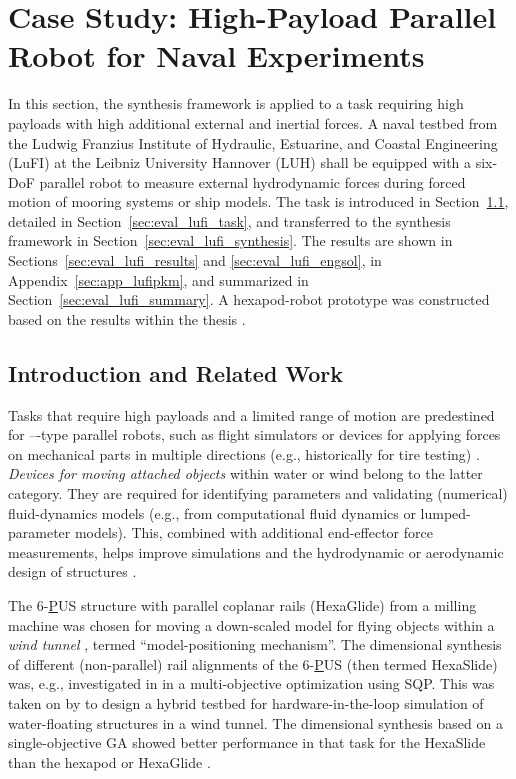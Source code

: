 %
%
%

\section{Case Study: High-Payload Parallel Robot for Naval Experiments}
\label{sec:eval_water}


%

%

%

%
%
%
%
%
%
%
%
%
%
%
%

In this section, the synthesis framework is applied to a task requiring high payloads with high additional external and inertial forces. %
%
%
A naval testbed from the Ludwig Franzius Institute of Hydraulic, Estuarine, and Coastal Engineering (LuFI) at the Leibniz University Hannover (LUH) shall be equipped with a six-DoF parallel robot to measure external hydrodynamic forces during forced motion of mooring systems or ship models.
The task is introduced in Section~\ref{sec:eval_lufi_intro}, detailed in Section~\ref{sec:eval_lufi_task}, and transferred to the synthesis framework in Section~\ref{sec:eval_lufi_synthesis}.
The results are shown in Sections~\ref{sec:eval_lufi_results} and \ref{sec:eval_lufi_engsol}, in Appendix~\ref{sec:app_lufipkm}, and summarized in Section~\ref{sec:eval_lufi_summary}.
A hexapod-robot prototype was constructed based on the results within the thesis \cite{Fettin2023_M1174}. %

\subsection{Introduction and Related Work}
\label{sec:eval_lufi_intro}

Tasks that require high payloads and a limited range of motion are predestined for ---type parallel robots, such as flight simulators or devices for applying forces on mechanical parts in multiple directions (e.g., historically for tire testing) \cite{Merlet2006}. 
\emph{Devices for moving attached objects} within water or wind belong to the latter category.
They are required for identifying parameters and validating (numerical) fluid-dynamics models (e.g., from computational fluid dynamics or lumped-parameter models). 
This, combined with additional end-effector force measurements, helps improve simulations and the hydrodynamic or aerodynamic design of structures \cite{GibertiFer2015}.
%

The 6-\underline{P}US %
%
structure with parallel coplanar rails (HexaGlide) from a milling machine was chosen for moving a down-scaled model for flying objects within a \emph{wind tunnel} \cite{Bergmann2005}, termed ``model-positioning mechanism''.
The dimensional synthesis of different (non-parallel) rail alignments of the 6-\underline{P}US (then termed HexaSlide) was, e.g., investigated in \cite{RaoRaoSah2005} in a multi-objective optimization using SQP.
This was taken on by \cite{GibertiFer2015} to design a hybrid testbed for hardware-in-the-loop simulation of water-floating structures in a wind tunnel.
The dimensional synthesis based on a single-objective GA showed better performance in that task for the HexaSlide than the hexapod \cite{FioreGib2016} or HexaGlide \cite{GibertiLaResPar2018}.


